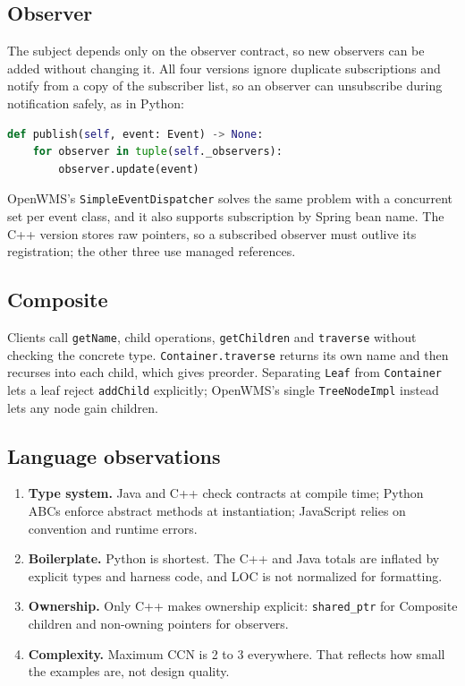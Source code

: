 \documentclass[11pt,a4paper]{article}
\newcommand{\code}[1]{\nolinkurl{#1}}
\begin{document}
\subsection{Observer}
The subject depends only on the observer contract, so new observers can be added without changing it. All four versions ignore duplicate subscriptions and notify from a copy of the subscriber list, so an observer can unsubscribe during notification safely, as in Python:

\begin{lstlisting}[language=Python]
def publish(self, event: Event) -> None:
    for observer in tuple(self._observers):
        observer.update(event)
\end{lstlisting}

OpenWMS's \code{SimpleEventDispatcher} solves the same problem with a concurrent set per event class, and it also supports subscription by Spring bean name. The C++ version stores raw pointers, so a subscribed observer must outlive its registration; the other three use managed references.

\subsection{Composite}
Clients call \code{getName}, child operations, \code{getChildren} and \code{traverse} without checking the concrete type. \code{Container.traverse} returns its own name and then recurses into each child, which gives preorder. Separating \code{Leaf} from \code{Container} lets a leaf reject \code{addChild} explicitly; OpenWMS's single \code{TreeNodeImpl} instead lets any node gain children.

\subsection{Language observations}
\begin{enumerate}[leftmargin=*,nosep]
\item \textbf{Type system.} Java and C++ check contracts at compile time; Python ABCs enforce abstract methods at instantiation; JavaScript relies on convention and runtime errors.
\item \textbf{Boilerplate.} Python is shortest. The C++ and Java totals are inflated by explicit types and harness code, and LOC is not normalized for formatting.
\item \textbf{Ownership.} Only C++ makes ownership explicit: \code{shared_ptr} for Composite children and non-owning pointers for observers.
\item \textbf{Complexity.} Maximum CCN is 2 to 3 everywhere. That reflects how small the examples are, not design quality.
\end{enumerate}
\end{document}
